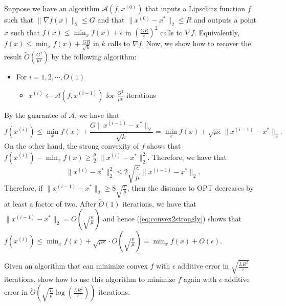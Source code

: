 Suppose we have an algorithm $\mathcal{A}(f,x^{(0)})$ that inputs
a Lipschitz function $f$ such that $\|\nabla f(x)\|_{2}\leq G$ and
that $\|x^{(0)}-x^{*}\|_{2}\leq R$ and outputs a point $x$ such
that $f(x)\leq\min_{x}f(x)+\epsilon$ in $(\frac{GR}{\epsilon})^{2}$
calls to $\nabla f$. Equivalently, $f(x)\leq\min_{x}f(x)+\frac{GR}{\sqrt{k}}$
in $k$ calls to $\nabla f$. Now, we show how to recover the result
$\widetilde{O}(\frac{G^{2}}{\mu\epsilon})$ by the following algorithm:
\begin{itemize}
\item For $i=1,2,\cdots,\widetilde{O}(1)$
\begin{itemize}
\item $x^{(i)}\leftarrow\mathcal{A}(f,x^{(i-1)})$ for $\frac{G^{2}}{\mu\epsilon}$
iterations
\end{itemize}
\end{itemize}
By the guarantee of $\mathcal{A}$, we have that 
\begin{equation}
f(x^{(i)})\leq\min_{x}f(x)+\frac{G\|x^{(i-1)}-x^{*}\|_{2}}{\sqrt{k}}=\min_{x}f(x)+\sqrt{\mu\epsilon}\|x^{(i-1)}-x^{*}\|_{2}.\label{eq:convex2strongly}
\end{equation}
On the other hand, the strong convexity of $f$ shows that $f(x^{(i)})-\min_{x}f(x)\geq\frac{\mu}{2}\cdot\|x^{(i)}-x^{*}\|_{2}^{2}$.
Therefore, we have that
\[
\|x^{(i)}-x^{*}\|_{2}^{2}\leq2\sqrt{\frac{\epsilon}{\mu}}\|x^{(i-1)}-x^{*}\|_{2}.
\]
Therefore, if $\|x^{(i-1)}-x^{*}\|_{2}\geq8\sqrt{\frac{\epsilon}{\mu}}$,
then the distance to OPT decreases by at least a factor of two. After
$\widetilde{O}(1)$ iterations, we have that $\|x^{(i-1)}-x^{*}\|_{2}=O\left(\sqrt{\frac{\epsilon}{\mu}}\right)$
and hence (\ref{eq:convex2strongly}) shows that $f(x^{(i)})\leq\min_{x}f(x)+\sqrt{\mu\epsilon}\cdot O\left(\sqrt{\frac{\epsilon}{\mu}}\right)=\min_{x}f(x)+O(\epsilon)$.
\begin{xca}
Given an algorithm that can minimize convex $f$ with $\epsilon$
additive error in $\sqrt{\frac{LR^{2}}{\epsilon}}$ iterations, show
how to use this algorithm to minimize $f$ again with $\epsilon$
additive error in $\widetilde{O}\left(\sqrt{\frac{L}{\mu}}\log\left(\frac{LR^{2}}{\epsilon}\right)\right)$
iterations.
\end{xca}


\subsection*{}%

